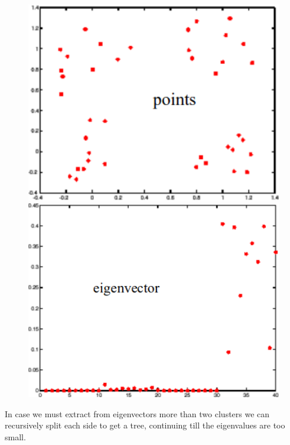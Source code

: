 \begin{figure}[H]
	\begin{minipage}[t]{0.49\linewidth} 
		\centering
		\includegraphics[width=1\textwidth]{img/eigenpoints}
	\end{minipage}        
	\hspace{1cm}
	\begin{minipage}[t]{0.49\linewidth} 
		\centering
		\includegraphics[width=1\textwidth]{img/eigenvectors}
	\end{minipage}
\end{figure}
In case we must extract from eigenvectors more than two clusters we can recursively split each side to get a tree, continuing till the eigenvalues are too small. 
